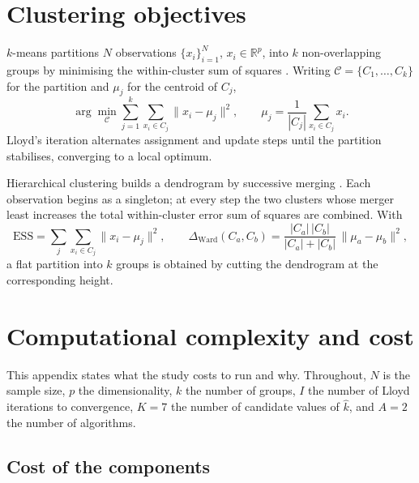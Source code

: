 \documentclass[pdflatex,sn-basic]{sn-jnl}
\begin{document}
\begin{appendices}

\section{Clustering objectives}
\label{app:algorithms}

$k$-means partitions $N$ observations $\{x_i\}_{i=1}^N$, $x_i \in
\mathbb{R}^p$, into $k$ non-overlapping groups by minimising the within-cluster
sum of squares \citep{macqueen1967}. Writing $\mathcal{C} = \{C_1,\dots,C_k\}$
for the partition and $\mu_j$ for the centroid of $C_j$,
\begin{equation}
  \arg\min_{\mathcal{C}} \sum_{j=1}^{k} \sum_{x_i \in C_j}
    \lVert x_i - \mu_j \rVert^2,
  \qquad
  \mu_j = \frac{1}{|C_j|}\sum_{x_i \in C_j} x_i .
  \label{eq:wcss}
\end{equation}
Lloyd's iteration alternates assignment and update steps until the partition
stabilises, converging to a local optimum.

Hierarchical clustering builds a dendrogram by successive merging
\citep{ward1963}. Each observation begins as a singleton; at every step the two
clusters whose merger least increases the total within-cluster error sum of
squares are combined. With
\begin{equation}
  \mathrm{ESS} = \sum_j \sum_{x_i \in C_j} \lVert x_i - \mu_j \rVert^2,
  \qquad
  \Delta_{\text{Ward}}(C_a, C_b)
    = \frac{|C_a|\,|C_b|}{|C_a| + |C_b|}\,
      \lVert \mu_a - \mu_b \rVert^2 ,
  \label{eq:ward}
\end{equation}
a flat partition into $k$ groups is obtained by cutting the dendrogram at the
corresponding height.

\section{Computational complexity and cost}
\label{app:complexity}

This appendix states what the study costs to run and why. Throughout, $N$ is the
sample size, $p$ the dimensionality, $k$ the number of groups, $I$ the number of
Lloyd iterations to convergence, $K = 7$ the number of candidate values of
$\hat{k}$, and $A = 2$ the number of algorithms.

\subsection{Cost of the components}


\end{appendices}
\end{document}

